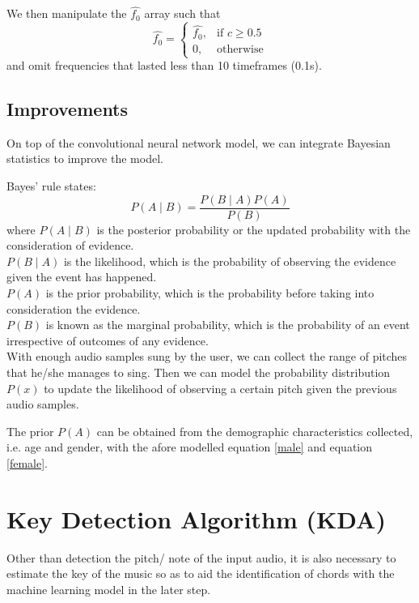 We then manipulate the $\hat{f_0}$ array such that
\[\hat{f_0}= 
\begin{cases}
    \hat{f_0},		& \text{if } c\geq 0.5\\
    0,              & \text{otherwise}
\end{cases}
\label{creperesult}
\]
and omit frequencies that lasted less than 10 timeframes (0.1s).
\subsection{Improvements}

On top of the convolutional neural network model, we can integrate Bayesian statistics to improve the model.

Bayes' rule states: 
\[P(A\mid B)=\frac {P(B\mid A)P(A)}{P(B)}\]
where $P(A\mid B)$ is the posterior probability or the updated probability with the consideration of evidence.\\
$P(B\mid A)$ is the likelihood, which is the probability of observing the evidence given the event has happened.\\
$P(A)$ is the prior probability, which is the probability before taking into consideration the evidence.\\
$P(B)$ is known as the marginal probability, which is the probability of an event irrespective of outcomes of any evidence. \\

With enough audio samples sung by the user, we can collect the range of pitches that he/she manages to sing. Then we can model 
the probability distribution $P(x)$ to update the likelihood of observing a certain pitch given the previous audio samples.

The prior $P(A)$ can be obtained from the demographic characteristics collected, i.e. age and gender, with the afore modelled equation
\ref{male} and equation \ref{female}.

\section{Key Detection Algorithm (KDA)}
\label{sec:KDA}
Other than detection the pitch/ note of the input audio, it is also necessary to estimate the key of the music so as to aid the identification
of chords with the machine learning model in the later step.

